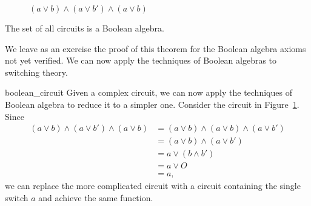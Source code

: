 \begin{figure}[htb]
\begin{center}

\end{center}
\caption{$(a \vee b) \wedge (a \vee b') \wedge (a \vee b)$} 
\label{Circuit2}
\end{figure}
 

\begin{theorem}\label{boolean:circuit_theorem}
The set of all circuits is a Boolean algebra.
\end{theorem}
 
 
We leave as an exercise the proof of this theorem for the Boolean
algebra axioms not yet verified. We can now apply the techniques of
Boolean algebras to switching theory. 
 
 

\begin{example}{boolean_circuit}
Given a complex circuit, we can now apply the techniques of
Boolean algebra to reduce it to a simpler one. Consider the circuit in 
Figure~\ref{Circuit2}. Since 
\begin{align*}
(a \vee b) \wedge (a \vee b') \wedge (a \vee b)
& =
(a \vee b) \wedge (a \vee b) \wedge (a \vee b') \\
& =
(a \vee b) \wedge (a \vee b') \\
& =
a \vee ( b \wedge b') \\
& =
a \vee O \\
& =
a,
\end{align*}
we can replace the more complicated circuit with a circuit containing
the single switch $a$ and achieve the same function.
\end{example}
 
